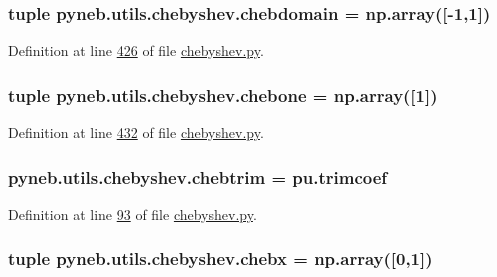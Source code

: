 \subsubsection[{chebdomain}]{\setlength{\rightskip}{0pt plus 5cm}tuple pyneb.\+utils.\+chebyshev.\+chebdomain = np.\+array(\mbox{[}-\/1,1\mbox{]})}\label{namespacepyneb_1_1utils_1_1chebyshev_a57e110567544748d0de429d3743d1241}


Definition at line \hyperlink{chebyshev_8py_source_l00426}{426} of file \hyperlink{chebyshev_8py_source}{chebyshev.\+py}.

\hypertarget{namespacepyneb_1_1utils_1_1chebyshev_a26a6cedd505a161858435461e1645503}{}
\subsubsection[{chebone}]{\setlength{\rightskip}{0pt plus 5cm}tuple pyneb.\+utils.\+chebyshev.\+chebone = np.\+array(\mbox{[}1\mbox{]})}\label{namespacepyneb_1_1utils_1_1chebyshev_a26a6cedd505a161858435461e1645503}


Definition at line \hyperlink{chebyshev_8py_source_l00432}{432} of file \hyperlink{chebyshev_8py_source}{chebyshev.\+py}.

\hypertarget{namespacepyneb_1_1utils_1_1chebyshev_a66b8c25023851573f25dc418071de82b}{}
\subsubsection[{chebtrim}]{\setlength{\rightskip}{0pt plus 5cm}pyneb.\+utils.\+chebyshev.\+chebtrim = pu.\+trimcoef}\label{namespacepyneb_1_1utils_1_1chebyshev_a66b8c25023851573f25dc418071de82b}


Definition at line \hyperlink{chebyshev_8py_source_l00093}{93} of file \hyperlink{chebyshev_8py_source}{chebyshev.\+py}.

\hypertarget{namespacepyneb_1_1utils_1_1chebyshev_a00f984b78341cd7920c46d1a6acacc5f}{}
\subsubsection[{chebx}]{\setlength{\rightskip}{0pt plus 5cm}tuple pyneb.\+utils.\+chebyshev.\+chebx = np.\+array(\mbox{[}0,1\mbox{]})}\label{namespacepyneb_1_1utils_1_1chebyshev_a00f984b78341cd7920c46d1a6acacc5f}


